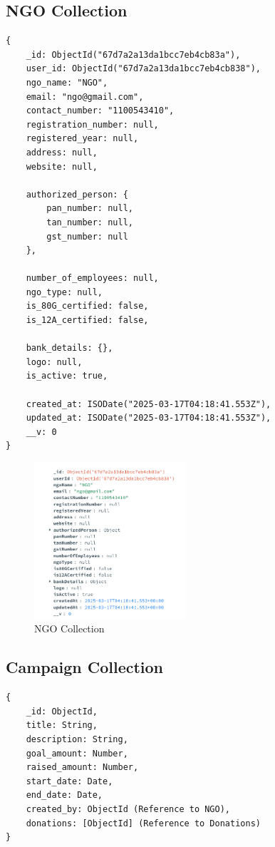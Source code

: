 \subsection{NGO Collection}
\begin{verbatim}
{
    _id: ObjectId("67d7a2a13da1bcc7eb4cb83a"),
    user_id: ObjectId("67d7a2a13da1bcc7eb4cb838"),
    ngo_name: "NGO",
    email: "ngo@gmail.com",
    contact_number: "1100543410",
    registration_number: null,
    registered_year: null,
    address: null,
    website: null,
    
    authorized_person: {
        pan_number: null,
        tan_number: null,
        gst_number: null
    },

    number_of_employees: null,
    ngo_type: null,
    is_80G_certified: false,
    is_12A_certified: false,

    bank_details: {},
    logo: null,
    is_active: true,
    
    created_at: ISODate("2025-03-17T04:18:41.553Z"),
    updated_at: ISODate("2025-03-17T04:18:41.553Z"),
    __v: 0
}
\end{verbatim}
\begin{figure}[h]
    \centering
    \includegraphics[width=0.5\textwidth]{images/NGO_Collection.png}
    \caption{NGO Collection}
    \label{fig:ngo_collection}
\end{figure}

\subsection{Campaign Collection}
\begin{verbatim}
{
    _id: ObjectId,
    title: String,
    description: String,
    goal_amount: Number,
    raised_amount: Number,
    start_date: Date,
    end_date: Date,
    created_by: ObjectId (Reference to NGO),
    donations: [ObjectId] (Reference to Donations)
}
\end{verbatim}


